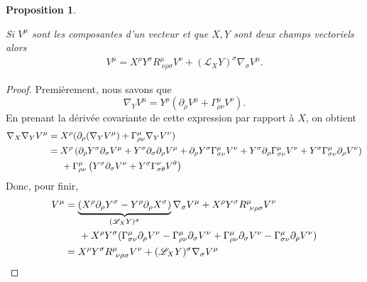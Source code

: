 \documentclass[a4paper,11pt]{report}
\theoremstyle{definition}
\theoremstyle{plain}
\newtheorem{prop}[thm]{Proposition}
\theoremstyle{definition}
\theoremstyle{remark}
\renewcommand{\L}{\mathscr{L}}
\newcommand{\p}{\partial}
\begin{document}
            \begin{prop}\begin{leftbar}
                Si $V^\mu$ sont les composantes d'un vecteur et que $X,Y$ sont deux champs vectoriels alors
                \begin{align}
                    [\nabla_X,\nabla_Y]V^\mu = X^\rho Y^\sigma R^{\mu}_{~\nu\rho\sigma}V^\nu + (\L_X Y)^\sigma\nabla_\sigma V^\mu.
                \end{align}
            \end{leftbar}\end{prop}
            
            \begin{proof}
                Premièrement, nous savons que
                \begin{equation}
                    \nabla_Y V^\mu = Y^\rho(\p_\rho V^\mu+\Gamma^\mu_{\rho\nu}V^\nu).
                \end{equation}
                En prenant la dérivée covariante de cette expression par rapport à $X$, on obtient
                \begin{align}
                    \nabla_X \nabla_Y V^\mu &= X^\rho(\p_\rho (\nabla_Y V^\mu)+\Gamma^\mu_{\rho\nu}\nabla_Y V^\nu)\\
                    &= X^\rho \left( \p_\rho Y^\sigma\p_\sigma V^\mu+Y^\sigma\p_\sigma\p_\rho V^\mu + \p_\rho Y^\sigma \Gamma^\mu_{\sigma\nu} V^\nu + Y^\sigma\p_\rho\Gamma^\mu_{\sigma\nu} V^\nu +Y^\sigma \Gamma^\mu_{\sigma\nu}\p_\rho V^\nu \right)\\
                    &\hspace{0.5cm}+\Gamma^\mu_{\rho\nu}\left( Y^\sigma\p_\sigma V^\nu + Y^\sigma \Gamma^\nu_{\sigma\theta} V^\theta \right)
                \end{align}
                Donc, pour finir,
                \begin{align}
                    [\nabla_X,\nabla_Y]V^\mu &= \underbrace{(X^\rho\p_\rho Y^\sigma-Y^\rho\p_\rho X^\sigma)}_{(\L_XY)^\sigma}\nabla_\sigma V^\mu+ X^\rho Y^\sigma R^\mu_{~\nu\rho\sigma} V^\nu\\
                    &\hspace{0.5cm}+ X^\rho Y^\sigma (\Gamma^\mu_{\sigma\nu}\p_\rho V^\nu-\Gamma^\mu_{\rho\nu}\p_\sigma V^\nu + \Gamma^\mu_{\rho\nu}\p_\sigma V^\nu-\Gamma^\mu_{\sigma\nu}\p_\rho V^\nu )\\
                    &= X^\rho Y^\sigma R^{\mu}_{~\nu\rho\sigma}V^\nu + (\L_X Y)^\sigma\nabla_\sigma V^\mu
                \end{align}
            \end{proof}
            
\end{document}
